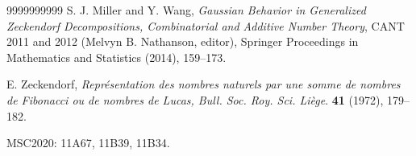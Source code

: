 \documentclass[]{interact}
\theoremstyle{plain}
\numberwithin{equation}{section} %
\numberwithin{table}{section} %
\numberwithin{figure}{section}
\begin{document}
\begin{thebibliography}{9999999999}
S. J. Miller and Y. Wang, \textit{Gaussian Behavior in Generalized Zeckendorf Decompositions, Combinatorial and Additive Number Theory}, CANT 2011 and 2012 (Melvyn B. Nathanson, editor), Springer Proceedings in Mathematics and Statistics (2014), 159–173.

 E. Zeckendorf, \textit{Représentation des nombres naturels par une somme de nombres de Fibonacci ou de nombres de Lucas, Bull. Soc. Roy. Sci. Liège}. \textbf{41} (1972), 179--182.


\end{thebibliography}

\medskip
\noindent MSC2020: 11A67, 11B39, 11B34.
\end{document}

